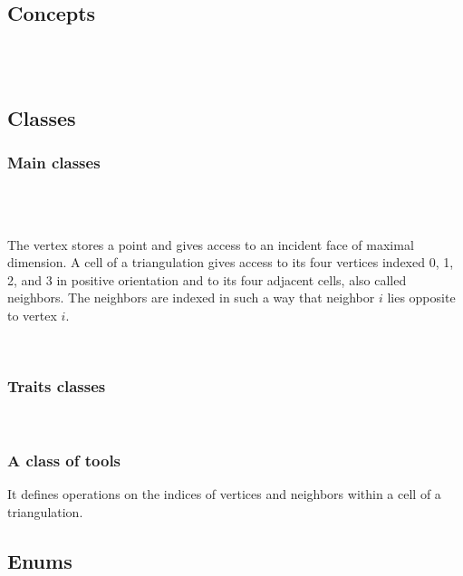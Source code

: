 \subsection*{Concepts}

\\
\\

\subsection*{Classes}

\subsubsection*{Main classes}


\\
\\

The vertex stores a point and gives access to an incident face of
maximal dimension. A cell of a triangulation gives access to its four
vertices indexed 0, 1, 2, and 3 in positive orientation and to its
four adjacent cells, also called neighbors. The neighbors are indexed
in such a way that neighbor $i$ lies opposite to vertex $i$.

\\

\subsubsection*{Traits classes}

\\

\subsubsection*{A class of tools}


It defines operations on the indices of vertices and neighbors within
a cell of a triangulation.

\subsection*{Enums}



